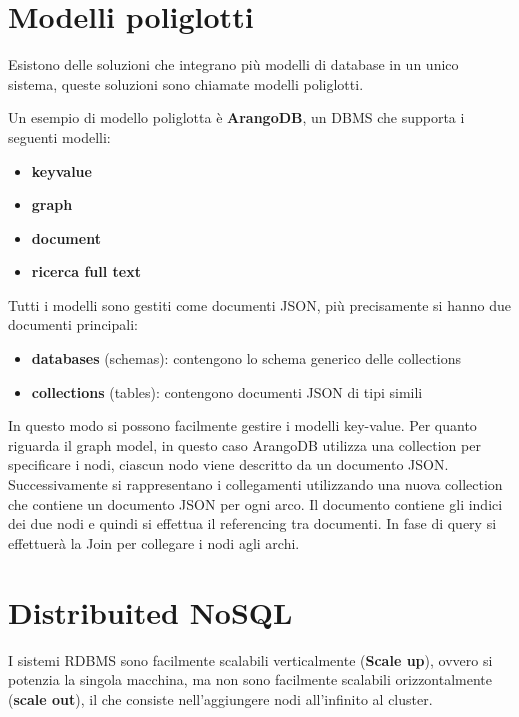       \section{Modelli poliglotti}
      Esistono delle soluzioni che integrano più modelli di database in un unico
      sistema, queste soluzioni sono chiamate modelli poliglotti.

      Un esempio di modello poliglotta è \textbf{ArangoDB}, un DBMS che supporta i
      seguenti modelli:
      \begin{itemize}
            \item \textbf{keyvalue}
            \item \textbf{graph}
            \item \textbf{document}
            \item \textbf{ricerca full text}
      \end{itemize}
      Tutti i modelli sono gestiti come documenti JSON, più precisamente si hanno due
      documenti principali:
      \begin{itemize}
            \item \textbf{databases} (schemas): contengono lo schema generico delle collections
            \item \textbf{collections} (tables): contengono documenti JSON di tipi simili
      \end{itemize}
      In questo modo si possono facilmente gestire i modelli key-value. Per quanto riguarda
      il graph model, in questo caso ArangoDB utilizza una collection per specificare
      i nodi, ciascun nodo viene descritto da un documento JSON. Successivamente si
      rappresentano i collegamenti utilizzando una nuova collection che contiene un documento
      JSON per ogni arco. Il documento contiene gli indici dei due nodi e quindi si effettua
      il referencing tra documenti. In fase di query si effettuerà la Join per collegare
      i nodi agli archi.
      \section{Distribuited NoSQL}
      I sistemi RDBMS sono facilmente scalabili verticalmente (\textbf{Scale up}),
      ovvero si potenzia la singola macchina, ma non sono facilmente scalabili
      orizzontalmente (\textbf{scale out}), il che consiste nell'aggiungere nodi
      all'infinito al cluster.


